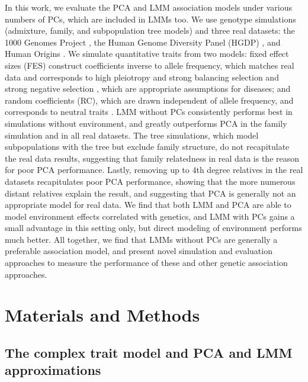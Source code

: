 \documentclass[9pt,lineno]{elife}
\begin{document}
In this work, we evaluate the PCA and LMM association models under various numbers of PCs, which are included in LMMs too.
We use genotype simulations (admixture, family, and subpopulation tree models) and three real datasets: the 1000 Genomes Project \citep{the_1000_genomes_project_consortium_map_2010, 1000_genomes_project_consortium_integrated_2012}, the Human Genome Diversity Panel (HGDP) \citep{cann_human_2002, rosenberg_genetic_2002, bergstrom_insights_2020}, and Human Origins \citep{patterson_ancient_2012, lazaridis_ancient_2014, lazaridis_genomic_2016, skoglund_genomic_2016}.
We simulate quantitative traits from two models: fixed effect sizes (FES) construct coefficients inverse to allele frequency, which matches real data \citep{park_distribution_2011, zeng_signatures_2018, oconnor_extreme_2019} and corresponds to high pleiotropy and strong balancing selection \citep{simons_population_2018} and strong negative selection \citep{zeng_signatures_2018, oconnor_extreme_2019}, which are appropriate assumptions for diseases; and random coefficients (RC), which are drawn independent of allele frequency, and corresponds to neutral traits \citep{zeng_signatures_2018, simons_population_2018}.
LMM without PCs consistently performs best in simulations without environment, and greatly outperforms PCA in the family simulation and in all real datasets.
The tree simulations, which model subpopulations with the tree but exclude family structure, do not recapitulate the real data results, suggesting that family relatedness in real data is the reason for poor PCA performance.
Lastly, removing up to 4th degree relatives in the real datasets recapitulates poor PCA performance, showing that the more numerous distant relatives explain the result, and suggesting that PCA is generally not an appropriate model for real data.
We find that both LMM and PCA are able to model environment effects correlated with genetics, and LMM with PCs gains a small advantage in this setting only, but direct modeling of environment performs much better.
All together, we find that LMMs without PCs are generally a preferable association model, and present novel simulation and evaluation approaches to measure the performance of these and other genetic association approaches.

\section{Materials and Methods}

\subsection{The complex trait model and PCA and LMM approximations}
\end{document}
